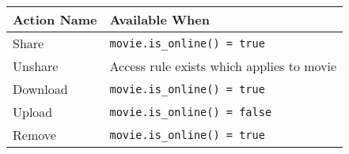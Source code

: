 \begin{tabularx}{\textwidth}{l|X}
\hline
 Action Name   & Available When                          \\
\hline
 Share     & \texttt{movie.is\_online() = true}           \\
 Unshare   & Access rule exists which applies to movie   \\
 Download  & \texttt{movie.is\_online() = true}           \\
 Upload    & \texttt{movie.is\_online() = false}          \\
 Remove    & \texttt{movie.is\_online() = true}           \\
\hline
\end{tabularx}